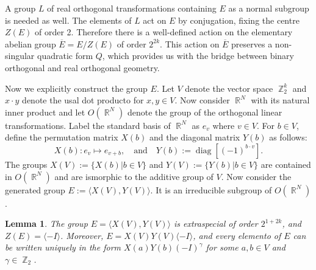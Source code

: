 \documentclass[a4paper]{article}
\DeclareMathOperator{\R}{\mathbb{R}}
\DeclareMathOperator{\Z}{\mathbb{Z}}
\DeclareMathOperator{\diag}{diag}
\newtheorem{lemma}{Lemma}
\begin{document}
  A group $L$ of real orthogonal transformations containing
  $E$ as a normal subgroup is needed as well. The elements
  of $L$ act on $E$ by conjugation, fixing the centre $Z(E)$ 
  of order 2. Therefore there is a well-defined action on
  the elementary abelian group $\overline{E} = E / Z(E)$ of
  order $2^{2k}$. This action on $\overline{E}$ preserves a
  non-singular quadratic form $Q$, which provides us with
  the bridge between binary orthogonal and real orthogonal
  geometry.

  Now we explicitly construct the group $E$. Let $V$ denote
  the vector space $\Z_2^{k}$ and $x \cdot y$ denote the
  usal dot producto for $x,y \in V$. Now consider $\R^{N}$ 
  with its natural inner product and let $O(\R^{N})$ denote
  the group of the orthogonal linear transformations. Label
  the standard basis of $\R^{N}$ as $e_v$ where $v \in V$.
  For $b \in V$, define the permutation matrix $X(b)$ and
  the diagonal matrix $Y(b)$ as follows:
  \[
    X(b) : e_v \mapsto e_{v+b},
    \quad
    \text{and}
    \quad
    Y(b) := \diag[(-1)^{b \cdot v}].
  \] 
  The groups $X(V) := \{X(b) | b \in V\}$ and $Y(V) :=
  \{Y(b) | b \in V\}$ are contained in $O(\R^{N})$ and are
  ismorphic to the additive group of $V$. Now consider the
  generated group $E := \langle X(V), Y(V)\rangle$. It is an
  irreducible subgroup of $O(\R^{N})$. 

  \begin{lemma}
    The group $E = \langle X(V), Y(V) \rangle$ is
    extraspecial of order $2^{1+2k}$, and $Z(E) = \langle -I
    \rangle$. Moreover, $E = X(V)Y(V)\langle -I \rangle$,
    and every elemento of $E$ can be written uniquely in the
    form $X(a)Y(b)(-I)^{\gamma}$ for some $a,b \in V$ and
    $\gamma \in \Z_2$.
  \end{lemma}
\end{document}
